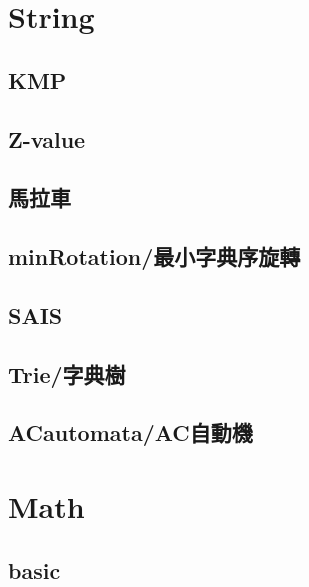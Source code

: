 \documentclass[a4paper,10pt,twocolumn,oneside]{article}
\begin{document}

\section{String}
    \subsection{KMP}
    

    \subsection{Z-value}
    

    \subsection{馬拉車}
    

    \subsection{minRotation/最小字典序旋轉}
    

    \subsection{SAIS}
    

    \subsection{Trie/字典樹}
    

    \subsection{ACautomata/AC自動機}
    

    




\section{Math}
    \subsection{basic}
    
\end{document}
